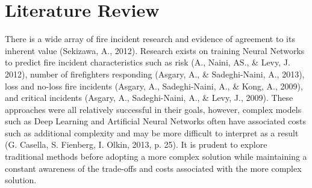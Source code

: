 \documentclass[12pt,letterpaper, oneside]
{article}
\begin{document}
\section{Literature Review}
There is a wide array of fire incident research and evidence of agreement to its inherent value (Sekizawa, A., 2012). Research exists on training Neural Networks to predict fire incident characteristics such as risk (A., Naini, AS., \& Levy, J. 2012), number of firefighters responding (Asgary, A., \& Sadeghi-Naini, A., 2013), loss and no-loss fire incidents (Asgary, A., Sadeghi-Naini, A., \& Kong, A., 2009), and critical incidents (Asgary, A., Sadeghi-Naini, A., \& Levy, J., 2009). These approaches were all relatively successful in their goals, however, complex models such as Deep Learning and Artificial Neural Networks often have associated costs such as additional complexity and may be more difficult to interpret as a result (G. Casella, S. Fienberg, I. Olkin, 2013, p. 25). It is prudent to explore traditional methods before adopting a more complex solution while maintaining a constant awareness of the trade-offs and costs associated with the more complex solution.
\end{document}
